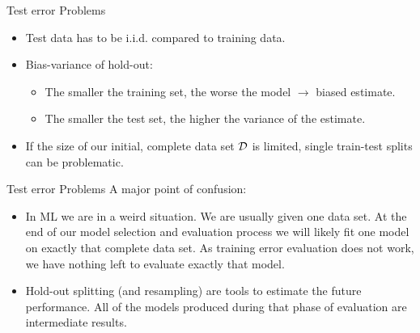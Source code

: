 \begin{vbframe}{Test error Problems}
\begin{itemize}
  \item Test data has to be i.i.d. compared to training data.
  \item Bias-variance of hold-out:\\
  \begin{itemize}
    \item The smaller the training set, the worse the model $\rightarrow$ biased estimate.\\
    \item The smaller the test set, the higher the variance of the estimate.
  \end{itemize}   
  \item If the size of our initial, complete data set $\mathcal{D}$ is limited,
  single train-test splits can be problematic.
\end{itemize}
\end{vbframe}

\begin{vbframe}{Test error Problems}
A major point of confusion:
\begin{itemize}
\item In ML we are in a weird situation. We are usually given one data set. At the end of our model selection and evaluation process
we will likely fit one model on exactly that complete data set. As training error evaluation does not work,
we have nothing left to evaluate exactly that model.
\item Hold-out splitting (and resampling) are tools to estimate the future
performance. All of the models produced during that phase of evaluation are intermediate results.
\end{itemize}
\end{vbframe}



% 
% 
% 
% 
% 

